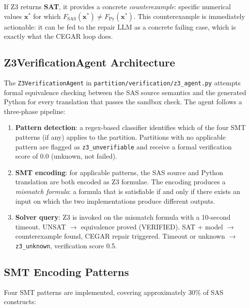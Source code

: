 If Z3 returns \textbf{SAT}, it provides a concrete \emph{counterexample}:
specific numerical values $\mathbf{x}^*$ for which
$F_{\text{SAS}}(\mathbf{x}^*) \neq F_{\text{Py}}(\mathbf{x}^*)$.
This counterexample is immediately actionable: it can be fed to the repair
LLM as a concrete failing case, which is exactly what the CEGAR loop does.

\subsection{Z3VerificationAgent Architecture}
\label{subsec:z3-arch-impl}

The \texttt{Z3VerificationAgent} in
\texttt{partition/verification/z3\_agent.py} attempts formal equivalence
checking between the SAS source semantics and the generated Python for every
translation that passes the sandbox check. The agent follows a three-phase
pipeline:

\begin{enumerate}
  \item \textbf{Pattern detection}: a regex-based classifier identifies which
    of the four SMT patterns (if any) applies to the partition. Partitions
    with no applicable pattern are flagged as \texttt{z3\_unverifiable} and
    receive a formal verification score of 0.0 (unknown, not failed).
  \item \textbf{SMT encoding}: for applicable patterns, the SAS source and
    Python translation are both encoded as Z3 formulae. The encoding produces
    a \emph{mismatch formula}: a formula that is satisfiable if and only if
    there exists an input on which the two implementations produce different
    outputs.
  \item \textbf{Solver query}: Z3 is invoked on the mismatch formula with a
    10-second timeout. UNSAT $\rightarrow$ equivalence proved (VERIFIED).
    SAT + model $\rightarrow$ counterexample found, CEGAR repair triggered.
    Timeout or unknown $\rightarrow$ \texttt{z3\_unknown}, verification score 0.5.
\end{enumerate}

\subsection{SMT Encoding Patterns}
\label{subsec:z3-patterns}

Four SMT patterns are implemented, covering approximately 30\% of SAS constructs:

